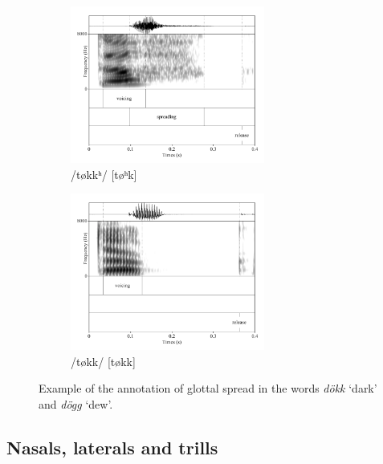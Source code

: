 \documentclass[11pt,a4paper,oneside,openany]{memoir}\usepackage[]{graphicx}\usepackage[]{color}
\begin{document}
\begin{figure}
\begin{subfigure}{\textwidth}
\centering
\includegraphics[width=0.7\textwidth]{dokk-spr}
\caption{/tøkkʰ/ [tøʰk]}
\end{subfigure}
\begin{subfigure}{\textwidth}
\centering
\includegraphics[width=0.7\textwidth]{dogg-spr}
\caption{/tøkk/ [tøkk]}
\end{subfigure}
\caption[Annotation of glottal spread]{Example of the annotation of glottal spread in the words \textit{dökk} `dark' and \textit{dögg} `dew'.}
\label{f:spreding}
\end{figure}

\subsection{Nasals, laterals and trills}
\end{document}
